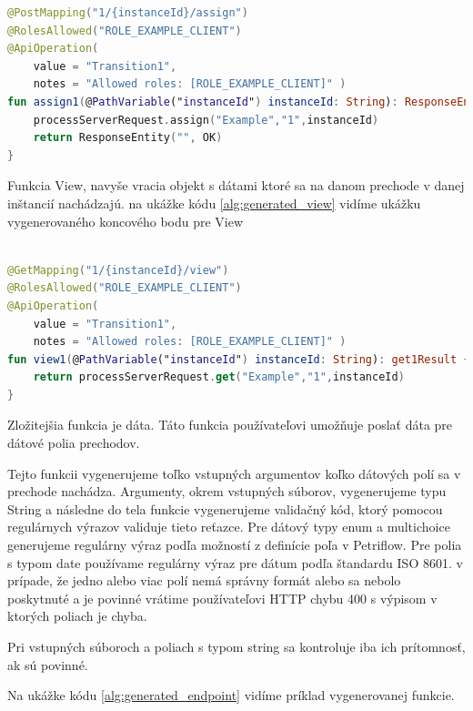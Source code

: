\begin{lstlisting}[float, caption={Príklad vygenerovanej funkcie},label={alg:generated_assign},language=Kotlin] 
@PostMapping("1/{instanceId}/assign") 
@RolesAllowed("ROLE_EXAMPLE_CLIENT") 
@ApiOperation( 
	value = "Transition1", 
	notes = "Allowed roles: [ROLE_EXAMPLE_CLIENT]" ) 
fun assign1(@PathVariable("instanceId") instanceId: String): ResponseEntity<String> { 
	processServerRequest.assign("Example","1",instanceId) 
	return ResponseEntity("", OK) 
} 
\end{lstlisting} 

Funkcia View, navyše vracia objekt s dátami ktoré sa na danom prechode v danej inštancií nachádzajú. na ukážke kódu \ref{alg:generated_view} vidíme ukážku vygenerovaného koncového bodu pre View 


\begin{lstlisting}[float, caption={Príklad vygenerovanej funkcie},label={alg:generated_view},language=Kotlin] 

@GetMapping("1/{instanceId}/view") 
@RolesAllowed("ROLE_EXAMPLE_CLIENT") 
@ApiOperation( 
	value = "Transition1", 
	notes = "Allowed roles: [ROLE_EXAMPLE_CLIENT]" ) 
fun view1(@PathVariable("instanceId") instanceId: String): get1Result { 
	return processServerRequest.get("Example","1",instanceId) 
} 
\end{lstlisting} 




Zložitejšia funkcia je dáta. Táto funkcia používateľovi umožňuje poslať dáta pre dátové polia prechodov.  

Tejto funkcii vygenerujeme toľko vstupných argumentov koľko dátových polí sa v prechode nachádza. Argumenty, okrem vstupných súborov, vygenerujeme typu String a následne do tela funkcie vygenerujeme validačný kód, ktorý pomocou regulárnych výrazov validuje tieto reťazce. Pre dátový typy enum a multichoice generujeme regulárny výraz podľa možností z definície poľa v Petriflow. Pre polia s typom date používame regulárny výraz pre dátum podľa štandardu ISO 8601. v prípade, že jedno alebo viac polí nemá správny formát alebo sa nebolo poskytnuté a je povinné vrátime používateľovi HTTP chybu 400 s výpisom v ktorých poliach je chyba. 



Pri vstupných súboroch a poliach s typom string sa kontroluje iba ich prítomnosť, ak sú povinné. 



Na ukážke kódu \ref{alg:generated_endpoint} vidíme príklad vygenerovanej funkcie. 



